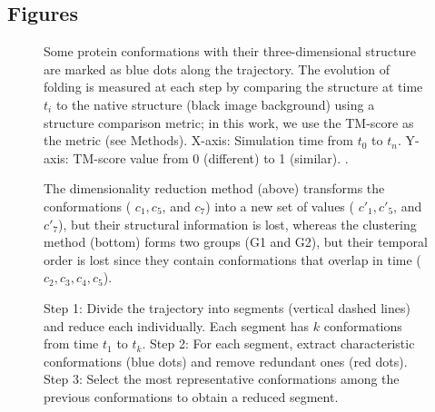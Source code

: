\documentclass[twocolumn]{bmcart}%
\begin{document}
\begin{backmatter}



\section*{Figures}

\begin{figure}[th]
\caption{ Some protein conformations with their three-dimensional structure are marked as blue dots along the trajectory. The evolution of folding is measured at each step by comparing the structure at time $t_{i}$ to the native structure (black image background) using a structure comparison metric; in this work, we use the TM-score as the metric (see Methods). X-axis: Simulation time from $t_{0}$ to $t_{n}$. Y-axis: TM-score value from 0 (different) to 1 (similar). \label{fig:Folding-Trajectory}. }
\end{figure}

\begin{figure}[th]
\caption{ The dimensionality reduction method (above) transforms the conformations ( $c_{1},c_{5}$, and $c_{7}$) into a new set of values ( $c'_{1},c'_{5}$, and $c'_{7}$), but their structural information is lost, whereas the clustering method (bottom) forms two groups (G1 and G2), but their temporal order is lost since they contain conformations that overlap in time ($c_{2},c_{3},c_{4},c_{5}$). \label{fig:lost-info-dimensionality}}
\end{figure}

\begin{figure}[th]
\caption{ Step 1: Divide the trajectory into segments (vertical dashed lines) and reduce each individually. Each segment has $k$ conformations from time $t_{1}$ to $t_{k}$. Step 2: For each segment, extract characteristic conformations (blue dots) and remove redundant ones (red dots). Step 3: Select the most representative conformations among the previous conformations to obtain a reduced segment. \label{fig:Algorithm-Description}}
\end{figure}


\end{backmatter}
\end{document}
